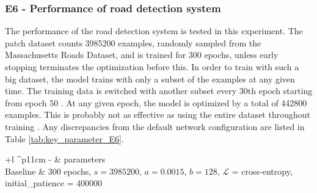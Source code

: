 \subsubsection{E6 - Performance of road detection system}
The performance of the road detection system is tested in this experiment. The patch dataset counts 3985200 examples, randomly sampled from the Massachusetts Roads Dataset, and is trained for 300 epochs, unless early stopping terminates the optimization before this. In order to train with such a big dataset, the model trains with only a subset of the examples at any given time. The training data is switched with another subset every 30th epoch starting from epoch 50 . At any given epoch, the model is optimized by a total of 442800 examples. This is probably not as effective as using the entire dataset throughout training . Any discrepancies from the default network configuration are listed in Table \ref{tab:key_parameter_E6}.
\begin{table}[h]
\caption{Key parameters for E6.}
\begin{center}
\begin{adjustbox}{max width=\textwidth}
\begin{tabular}{+l ^p{11cm}}\hline
\rowstyle{\bfseries}
  - & parameters \\\hline
  Baseline & 300 epochs, $s=3 985 200$, $a=0.0015$, $b=128$, $\mathcal{L}$ = cross-entropy, initial\_patience = 400000  \\
  \hline
\end{tabular}
\end{adjustbox}
\end{center}
\label{tab:key_parameter_E6}
\end{table}